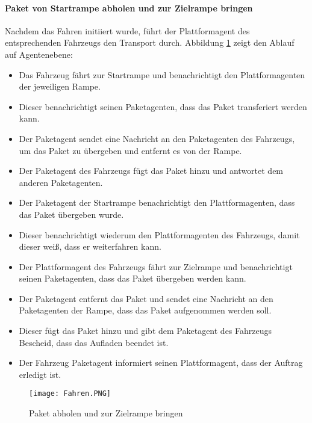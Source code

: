 \paragraph{Paket von Startrampe abholen und zur Zielrampe bringen}
Nachdem das Fahren initiiert wurde, führt der Plattformagent des entsprechenden Fahrzeugs den Transport durch. Abbildung \ref{Fahren} zeigt den Ablauf auf Agentenebene:
\begin{itemize}
\item Das Fahrzeug fährt zur Startrampe und benachrichtigt den Plattformagenten der jeweiligen Rampe.
\item Dieser benachrichtigt seinen Paketagenten, dass das Paket transferiert werden kann. 
\item Der Paketagent sendet eine Nachricht an den Paketagenten des Fahrzeugs, um das Paket zu übergeben und entfernt es von der Rampe.
\item Der Paketagent des Fahrzeugs fügt das Paket hinzu und antwortet dem anderen Paketagenten.
\item Der Paketagent der Startrampe  benachrichtigt den Plattformagenten, dass das Paket übergeben wurde.
\item Dieser benachrichtigt wiederum den Plattformagenten des Fahrzeugs, damit dieser weiß, dass er weiterfahren kann.
\item Der Plattformagent des Fahrzeugs fährt zur Zielrampe und benachrichtigt seinen Paketagenten, dass das Paket übergeben werden kann.
\item Der Paketagent entfernt das Paket und sendet eine Nachricht an den Paketagenten der Rampe, dass das Paket aufgenommen werden soll.
\item Dieser fügt das Paket hinzu und gibt dem Paketagent des Fahrzeugs Bescheid, dass das Aufladen beendet ist.
\item Der Fahrzeug Paketagent informiert seinen Plattformagent, dass der Auftrag erledigt ist.
\end{itemize}
\begin{figure}[h!]
	\centering
		\texttt{[image: Fahren.PNG]}        
		\caption{Paket abholen und zur Zielrampe bringen}
	\label{Fahren}
\end{figure}
